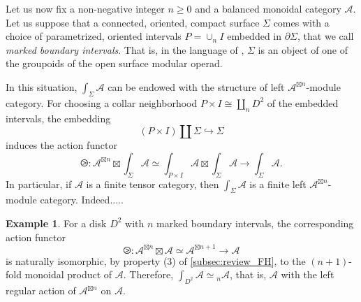 \documentclass[11pt]{article}
\theoremstyle{definition}
\newtheorem{example}[theorem]{Example}
\begin{document}
Let us now fix a non-negative integer $n \geq 0$ and a balanced monoidal category $\mathcal{A}$.  Let us suppose that a connected, oriented, compact surface $\Sigma$ comes with a choice of parametrized, oriented intervals $P= \cup_n I $ embedded in $\partial \Sigma$, that we call \emph{marked boundary intervals}. That is, in the language of \cite{envas}, $\Sigma$ is an object of one of the groupoids of the open surface modular operad. 

In this situation, $\int_\Sigma \mathcal{A}$ can be endowed with the structure of left $\mathcal{A}^{\boxtimes n}$-module category. For choosing a collar neighborhood $P \times I \cong \amalg_n D^2$ of the embedded intervals, the embedding $$ (P \times I  ) \amalg \Sigma \hookrightarrow \Sigma  $$ induces the action functor $$ \ogreaterthan: \mathcal{A}^{\boxtimes n} \boxtimes  \int_\Sigma \mathcal{A} \simeq \int_{P \times I} \mathcal{A} \boxtimes \int_\Sigma \mathcal{A} \longrightarrow \int_\Sigma \mathcal{A}  .$$
In particular, if $\mathcal{A}$ is a finite tensor category, then $\int_\Sigma \mathcal{A}$ is a finite left $\mathcal{A}^{\boxtimes n}$-module category. Indeed..... 




\begin{example}\label{ex:disk_case}
For a disk $D^2$ with $n$ marked boundary intervals, the corresponding action functor 
$$ \ogreaterthan : \mathcal{A}^{\boxtimes n} \boxtimes \mathcal{A} \simeq \mathcal{A}^{\boxtimes n+1} \longrightarrow \mathcal{A}  $$
is naturally isomorphic, by property (3) of \cref{subsec:review_FH}, to the $(n+1)$-fold monoidal product of $\mathcal{A}$. Therefore, $\int_{D^2} \mathcal{A} \simeq {}_n \mathcal{A}$, that is, $\mathcal{A}$ with the left regular action of $\mathcal{A}^{\boxtimes n}$ on $\mathcal{A}$.
\end{example}
\end{document}
